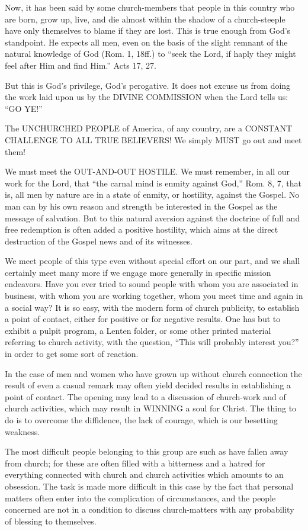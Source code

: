 \documentclass[
]{book}
\begin{document}
Now, it has been said by some church-members that people in this country who are born, grow up, live, and die almost within the shadow of a church-steeple have only themselves to blame if they are lost. This is true enough from God's standpoint. He expects all men, even on the basis of the slight remnant of the natural knowledge of God (Rom. 1, 18ff.) to ``seek the Lord, if haply they might feel after Him and find Him.'' Acts 17, 27.

But this is God's privilege, God's perogative. It does not excuse us from doing the work laid upon us by the DIVINE COMMISSION when the Lord tells us: ``GO YE!''

The UNCHURCHED PEOPLE of America, of any country, are a CONSTANT CHALLENGE TO ALL TRUE BELIEVERS! We simply MUST go out and meet them!

We must meet the OUT-AND-OUT HOSTILE. We must remember, in all our work for the Lord, that ``the carnal mind is enmity against God,'' Rom. 8, 7, that is, all men by nature are in a state of enmity, or hostility, against the Gospel. No man can by his own reason and strength be interested in the Gospel as the message of salvation. But to this natural aversion against the doctrine of full and free redemption is often added a positive hostility, which aims at the direct destruction of the Gospel news and of its witnesses.

We meet people of this type even without special effort on our part, and we shall certainly meet many more if we engage more generally in specific mission endeavors. Have you ever tried to sound people with whom you are associated in business, with whom you are working together, whom you meet time and again in a social way? It is so easy, with the modern form of church publicity, to establish a point of contact, either for positive or for negative results. One has but to exhibit a pulpit program, a Lenten folder, or some other printed material referring to church activity, with the question, ``This will probably interest you?'' in order to get some sort of reaction.

In the case of men and women who have grown up without church connection the result of even a casual remark may often yield decided results in establishing a point of contact. The opening may lead to a discussion of church-work and of church activities, which may result in WINNING a soul for Christ. The thing to do is to overcome the diffidence, the lack of courage, which is our besetting weakness.

The most difficult people belonging to this group are such as have fallen away from church; for these are often filled with a bitterness and a hatred for everything connected with church and church activities which amounts to an obsession. The task is made more difficult in this case by the fact that personal matters often enter into the complication of circumstances, and the people concerned are not in a condition to discuss church-matters with any probability of blessing to themselves.
\end{document}
